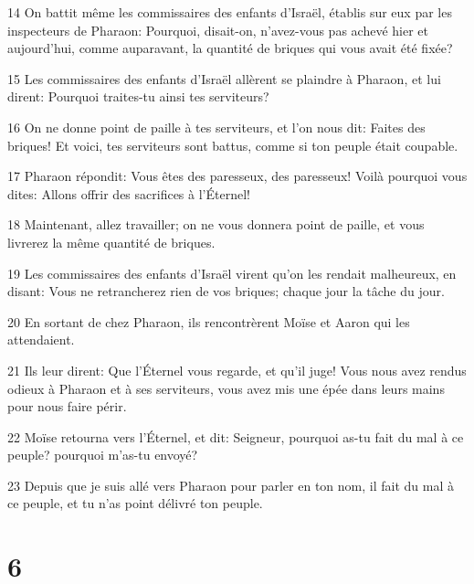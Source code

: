 \par 14 On battit même les commissaires des enfants d'Israël, établis sur eux par les inspecteurs de Pharaon: Pourquoi, disait-on, n'avez-vous pas achevé hier et aujourd'hui, comme auparavant, la quantité de briques qui vous avait été fixée?
\par 15 Les commissaires des enfants d'Israël allèrent se plaindre à Pharaon, et lui dirent: Pourquoi traites-tu ainsi tes serviteurs?
\par 16 On ne donne point de paille à tes serviteurs, et l'on nous dit: Faites des briques! Et voici, tes serviteurs sont battus, comme si ton peuple était coupable.
\par 17 Pharaon répondit: Vous êtes des paresseux, des paresseux! Voilà pourquoi vous dites: Allons offrir des sacrifices à l'Éternel!
\par 18 Maintenant, allez travailler; on ne vous donnera point de paille, et vous livrerez la même quantité de briques.
\par 19 Les commissaires des enfants d'Israël virent qu'on les rendait malheureux, en disant: Vous ne retrancherez rien de vos briques; chaque jour la tâche du jour.
\par 20 En sortant de chez Pharaon, ils rencontrèrent Moïse et Aaron qui les attendaient.
\par 21 Ils leur dirent: Que l'Éternel vous regarde, et qu'il juge! Vous nous avez rendus odieux à Pharaon et à ses serviteurs, vous avez mis une épée dans leurs mains pour nous faire périr.
\par 22 Moïse retourna vers l'Éternel, et dit: Seigneur, pourquoi as-tu fait du mal à ce peuple? pourquoi m'as-tu envoyé?
\par 23 Depuis que je suis allé vers Pharaon pour parler en ton nom, il fait du mal à ce peuple, et tu n'as point délivré ton peuple.

\chapter{6}

